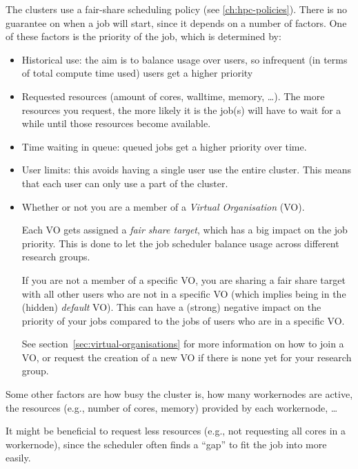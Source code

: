 The \hpcInfra clusters use a fair-share scheduling policy (see \autoref{ch:hpc-policies}). There is no guarantee on when a
job will start, since it depends on a number of factors. One of these factors is
the priority of the job, which is determined by:
\begin{itemize}
    \item Historical use: the aim is to balance usage over users, so
        infrequent (in terms of total compute time used) users get a higher priority

    \item Requested resources (amount of cores, walltime, memory, \ldots).
        The more resources you request, the more likely it is the job(s) will
        have to wait for a while until those resources become available.

    \item Time waiting in queue: queued jobs get a higher priority over time.

    \item User limits: this avoids having a single user use the entire cluster.
        This means that each user can only use a part of the cluster.

    \item Whether or not you are a member of a \emph{Virtual Organisation} (VO).

        Each VO gets assigned a \emph{fair share target}, which has a big impact
        on the job priority. This is done to let the job scheduler balance usage
        across different research groups.

        If you are not a member of a specific VO, you are sharing a fair share target
        with all other users who are not in a specific VO (which implies being in the (hidden)
        \emph{default} VO).
        This can have a (strong) negative impact on the priority of your jobs
        compared to the jobs of users who are in a specific VO.

        See section~\autoref{sec:virtual-organisations} for more information on how to join a VO,
        or request the creation of a new VO if there is none yet for your research group.

\end{itemize}

Some other factors are how busy the cluster is, how many workernodes are active,
the resources (e.g., number of cores, memory) provided by each workernode, \ldots

It might be beneficial to request less resources (e.g., not requesting all cores
in a workernode), since the scheduler often finds a ``gap'' to fit the job into
more easily.

